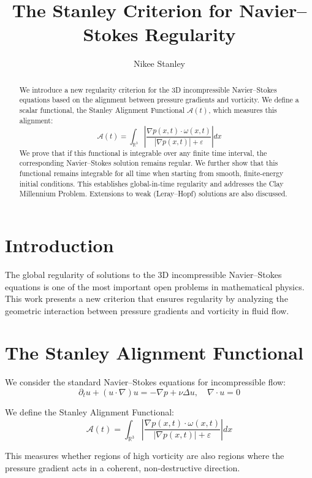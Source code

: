 \documentclass[11pt]{article}
\title{The Stanley Criterion for Navier--Stokes Regularity}
\author{Nikee Stanley}
\date{}
\begin{document}
\maketitle

\begin{abstract}
We introduce a new regularity criterion for the 3D incompressible Navier--Stokes equations based on the alignment between pressure gradients and vorticity. We define a scalar functional, the Stanley Alignment Functional $\mathcal{A}(t)$, which measures this alignment:
\[
\mathcal{A}(t) = \int_{\mathbb{R}^3} \left| \frac{\nabla p(x, t) \cdot \omega(x, t)}{|\nabla p(x, t)| + \varepsilon} \right| dx
\]
We prove that if this functional is integrable over any finite time interval, the corresponding Navier--Stokes solution remains regular. We further show that this functional remains integrable for all time when starting from smooth, finite-energy initial conditions. This establishes global-in-time regularity and addresses the Clay Millennium Problem. Extensions to weak (Leray--Hopf) solutions are also discussed.
\end{abstract}

\section{Introduction}

The global regularity of solutions to the 3D incompressible Navier--Stokes equations is one of the most important open problems in mathematical physics. This work presents a new criterion that ensures regularity by analyzing the geometric interaction between pressure gradients and vorticity in fluid flow.

\section{The Stanley Alignment Functional}

We consider the standard Navier--Stokes equations for incompressible flow:
\[
\partial_t u + (u \cdot \nabla)u = -\nabla p + \nu \Delta u, \quad \nabla \cdot u = 0
\]

We define the Stanley Alignment Functional:
\[
\mathcal{A}(t) = \int_{\mathbb{R}^3} \left| \frac{\nabla p(x, t) \cdot \omega(x, t)}{|\nabla p(x, t)| + \varepsilon} \right| dx
\]

This measures whether regions of high vorticity are also regions where the pressure gradient acts in a coherent, non-destructive direction.
\end{document}
